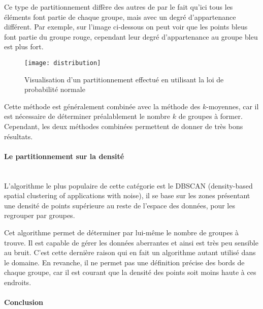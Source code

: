 Ce type de partitionnement diffère des autres de par le fait qu'ici tous les éléments font partie de chaque groupe, mais avec un degré d'appartenance différent.
Par exemple, sur l'image ci-dessous on peut voir que les points bleus font partie du groupe rouge, cependant leur degré d'appartenance au groupe bleu est plus fort.

\FloatBarrier
\begin{figure}[h!]
    \begin{minipage}[c]{0.45\textwidth}
        \begin{center}
            \texttt{[image: distribution]}
        \end{center}
    \end{minipage}\hfill
    \begin{minipage}[c]{0.45\textwidth}
        \caption{Visualisation d'un partitionnement effectué en utilisant la loi de probabilité normale}
        \label{figure:distribution}
    \end{minipage}
\end{figure}
\FloatBarrier

Cette méthode est généralement combinée avec la méthode des $k$-moyennes, car il est nécessaire de déterminer préalablement le nombre $k$ de groupes à former.
Cependant, les deux méthodes combinées permettent de donner de très bons résultats.

\paragraph*{Le partitionnement sur la densité}
~\\

L'algorithme le plus populaire de cette catégorie est le DBSCAN (density-based spatial clustering of applications with noise), il se base sur les zones présentant une densité de points supérieure au reste de l'espace des données, pour les regrouper par groupes.

Cet algorithme permet de déterminer par lui-même le nombre de groupes à trouve.
Il est capable de gérer les données aberrantes et ainsi est très peu sensible au bruit.
C'est cette dernière raison qui en fait un algorithme autant utilisé dans le domaine.
En revanche, il ne permet pas une définition précise des bords de chaque groupe, car il est courant que la densité des points soit moins haute à ces endroits.

\paragraph*{Conclusion}
~\\

